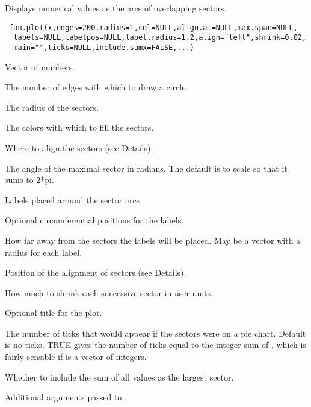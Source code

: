 \begin{Description}\relax
Displays numerical values as the arcs of overlapping sectors.
\end{Description}
\begin{Usage}
\begin{verbatim}
 fan.plot(x,edges=200,radius=1,col=NULL,align.at=NULL,max.span=NULL,
  labels=NULL,labelpos=NULL,label.radius=1.2,align="left",shrink=0.02,
  main="",ticks=NULL,include.sumx=FALSE,...)
\end{verbatim}
\end{Usage}
\begin{Arguments}
\begin{ldescription}
\item[\code{x}] Vector of numbers.
\item[\code{edges}] The number of edges with which to draw a circle.
\item[\code{radius}] The radius of the sectors.
\item[\code{col}] The colors with which to fill the sectors.
\item[\code{align.at}] Where to align the sectors (see Details).
\item[\code{max.span}] The angle of the maximal sector in radians. The default
is to scale  so that it sums to 2*pi.
\item[\code{labels}] Labels placed around the sector arcs.
\item[\code{labelpos}] Optional circumferential positions for the labels.
\item[\code{label.radius}] How far away from the sectors the labels will
be placed. May be a vector with a radius for each label.
\item[\code{align}] Position of the alignment of sectors (see Details).
\item[\code{shrink}] How much to shrink each successive sector in user units.
\item[\code{main}] Optional title for the plot.
\item[\code{ticks}] The number of ticks that would appear if the sectors were on
a pie chart. Default is no ticks, TRUE gives the number of ticks equal to
the integer sum of , which is fairly sensible if 
 is a vector of integers.
\item[\code{include.sumx}] Whether to include the sum of all  values
as the largest sector.
\item[\code{...}] Additional arguments passed to .
\end{ldescription}
\end{Arguments}
